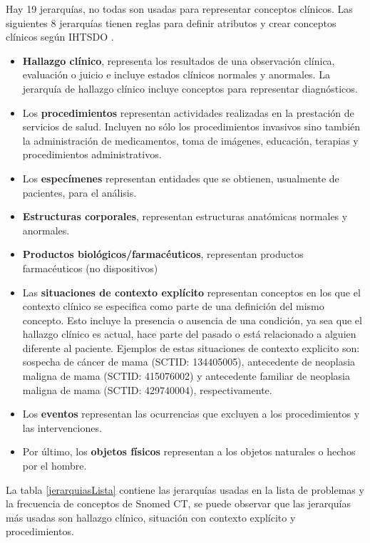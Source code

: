 Hay 19 jerarquías, no todas son usadas para representar conceptos clínicos. Las siguientes 8 jerarquías tienen reglas para definir atributos y crear conceptos clínicos según \acrshort{IHTSDO} \cite{ihtsdo2016EG}.

\begin{itemize}
\item \textbf{Hallazgo clínico}, representa los resultados de una observación clínica, evaluación o juicio e incluye estados clínicos normales y anormales. La jerarquía de hallazgo clínico incluye conceptos para representar diagnósticos.
\item Los \textbf{procedimientos} representan actividades realizadas en la prestación de servicios de salud. Incluyen no sólo los procedimientos invasivos sino también la administración de medicamentos, toma  de imágenes, educación, terapias y procedimientos administrativos.
\item Los \textbf{especímenes} representan entidades que se obtienen, usualmente de pacientes, para el análisis.
\item \textbf{Estructuras corporales}, representan estructuras anatómicas normales y anormales.
\item \textbf{Productos biológicos/farmacéuticos}, representan productos farmacéuticos (no dispositivos)
\item Las \textbf{situaciones de contexto explícito} representan conceptos en los que el contexto clínico se especifica como parte de una definición del mismo concepto. Esto incluye la presencia o ausencia de una condición, ya sea que el hallazgo clínico es actual, hace parte del pasado o está relacionado a alguien diferente al paciente. Ejemplos de estas situaciones de contexto explicito son: sospecha de cáncer de mama (SCTID: 134405005), antecedente de neoplasia maligna de mama (SCTID: 415076002) y antecedente familiar de neoplasia maligna de mama (SCTID: 429740004), respectivamente.
\item Los \textbf{eventos} representan las ocurrencias que excluyen a los procedimientos y las intervenciones.
\item Por último, los \textbf{objetos físicos }representan a los objetos naturales o hechos por el hombre.
\end{itemize}
 
La tabla \ref{jerarquiasLista} contiene las jerarquías usadas en la lista de problemas y la frecuencia de conceptos de Snomed CT, se puede observar que las jerarquías más usadas son hallazgo clínico, situación con contexto explícito y procedimientos.

